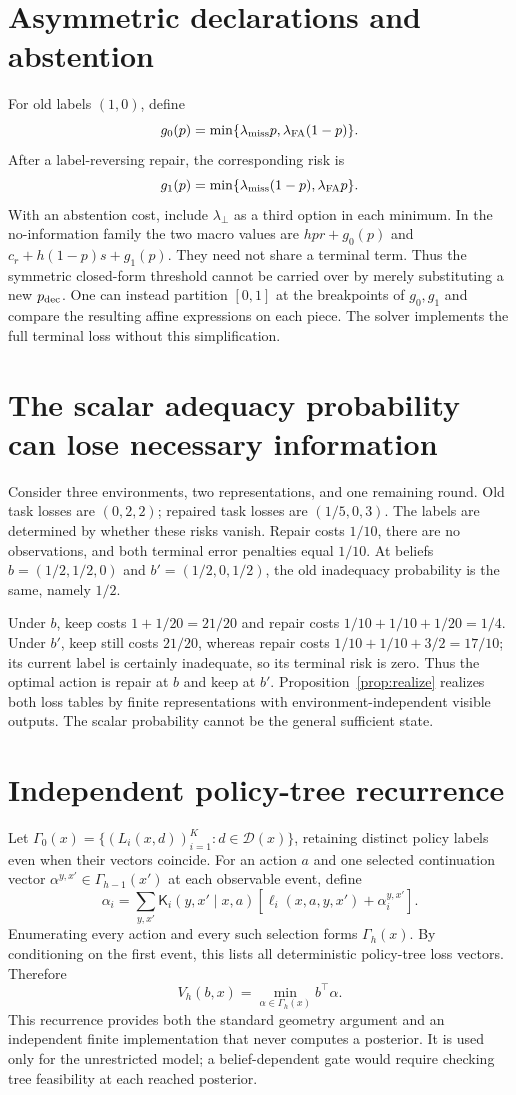 \section{Asymmetric declarations and abstention}
For old labels $(1,0)$, define
\[
g_0(p)=\min\{\lambda_{\rm miss}p,\lambda_{\rm FA}(1-p)\}.
\]
After a label-reversing repair, the corresponding risk is
\[
g_1(p)=\min\{\lambda_{\rm miss}(1-p),\lambda_{\rm FA}p\}.
\]
With an abstention cost, include $\lambda_\bot$ as a third option in each
minimum. In the no-information family the two macro values are
$hpr+g_0(p)$ and $c_r+h(1-p)s+g_1(p)$.
They need not share a terminal term. Thus the symmetric closed-form threshold
cannot be carried over by merely substituting a new $p_{\mathrm{dec}}$.
One can instead partition $[0,1]$ at the breakpoints of $g_0,g_1$ and compare the
resulting affine expressions on each piece. The solver implements the full
terminal loss without this simplification.

\section{The scalar adequacy probability can lose necessary information}
Consider three environments, two representations, and one remaining round.
Old task losses are $(0,2,2)$; repaired task losses are $(1/5,0,3)$.
The labels are determined by whether these risks vanish. Repair costs $1/10$,
there are no observations, and both terminal error penalties equal $1/10$.
At beliefs $b=(1/2,1/2,0)$ and $b'=(1/2,0,1/2)$, the old inadequacy probability
is the same, namely $1/2$.

Under $b$, keep costs $1+1/20=21/20$ and repair costs
$1/10+1/10+1/20=1/4$. Under $b'$, keep still costs $21/20$, whereas
repair costs $1/10+1/10+3/2=17/10$; its current label is certainly inadequate,
so its terminal risk is zero. Thus the optimal action is repair at $b$ and keep
at $b'$. Proposition~\ref{prop:realize} realizes both loss tables by finite
representations with environment-independent visible outputs.
The scalar probability cannot be the general sufficient state.

\section{Independent policy-tree recurrence}
Let $\Gamma_0(x)=\{(L_i(x,d))_{i=1}^K:d\in\mathcal D(x)\}$, retaining
distinct policy labels even when their vectors coincide.
For an action $a$ and one selected continuation vector
$\alpha^{y,x'}\in\Gamma_{h-1}(x')$ at each observable event, define
\[
\alpha_i=\sum_{y,x'}\mathsf K_i(y,x'\mid x,a)
\left[\ell_i(x,a,y,x')+\alpha_i^{y,x'}\right].
\]
Enumerating every action and every such selection forms $\Gamma_h(x)$.
By conditioning on the first event, this lists all deterministic policy-tree
loss vectors. Therefore
\[
V_h(b,x)=\min_{\alpha\in\Gamma_h(x)}b^\top\alpha.
\]
This recurrence provides both the standard geometry argument and an independent
finite implementation that never computes a posterior. It is used only for the
unrestricted model; a belief-dependent gate would require checking tree
feasibility at each reached posterior.

